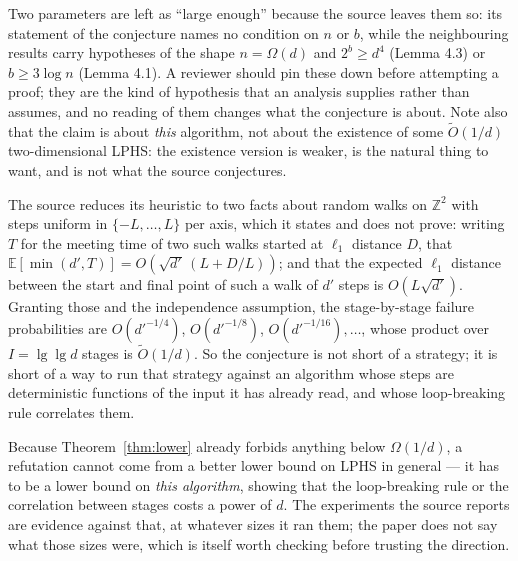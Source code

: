 \documentclass{aicr-conjecture}
\newcommand{\Z}{\mathbb{Z}}
\newcommand{\Ot}{\widetilde{O}}
\newcommand{\Om}{\Omega}
\begin{document}
\begin{remark}
Two parameters are left as ``large enough'' because the source leaves
them so: its statement of the conjecture names no condition on $n$ or
$b$, while the neighbouring results carry hypotheses of the shape
$n = \Om(d)$ and $2^{b} \ge d^{4}$ (Lemma 4.3) or $b \ge 3\log n$
(Lemma 4.1). A reviewer should pin these down before attempting a
proof; they are the kind of hypothesis that an analysis supplies rather
than assumes, and no reading of them changes what the conjecture is
about. Note also that the claim is about \emph{this} algorithm, not
about the existence of some $\Ot(1/d)$ two-dimensional LPHS\@: the
existence version is weaker, is the natural thing to want, and is not
what the source conjectures.
\end{remark}

\begin{remark}
The source reduces its heuristic to two facts about random walks on
$\Z^{2}$ with steps uniform in $\{-L, \dots, L\}$ per axis, which it
states and does not prove: writing $T$ for the meeting
time of two such walks started at $\ell_{1}$ distance $D$, that
$\mathbb{E}[\min(d', T)] = O(\sqrt{d'}\,(L + D/L))$; and that the
expected $\ell_{1}$ distance between the start and final point of such
a walk of $d'$ steps is $O(L\sqrt{d'})$. Granting those and the
independence assumption, the stage-by-stage failure probabilities are
$O(d'^{-1/4})$, $O(d'^{-1/8})$, $O(d'^{-1/16}), \dots$, whose product
over $I = \lg\lg d$ stages is $\Ot(1/d)$. So the conjecture is not
short of a strategy; it is short of a way to run that strategy against
an algorithm whose steps are deterministic functions of the input it has
already read, and whose loop-breaking rule correlates them.
\end{remark}

\begin{remark}
Because Theorem~\ref{thm:lower} already forbids anything below
$\Om(1/d)$, a refutation cannot come from a better lower bound on LPHS
in general --- it has to be a lower bound on \emph{this algorithm},
showing that the loop-breaking rule or the correlation between stages
costs a power of $d$. The experiments the source reports are evidence
against that, at whatever sizes it ran them; the paper does not say what
those sizes were, which is itself worth checking before trusting the
direction.
\end{remark}
\end{document}

